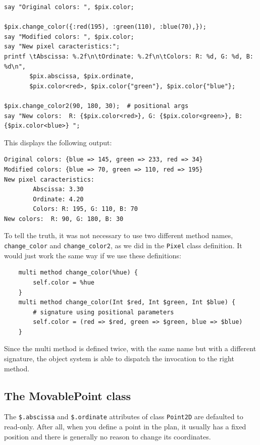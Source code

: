 \begin{verbatim}
say "Original colors: ", $pix.color;

$pix.change_color({:red(195), :green(110), :blue(70),});
say "Modified colors: ", $pix.color;
say "New pixel caracteristics:";
printf \tAbscissa: %.2f\n\tOrdinate: %.2f\n\tColors: R: %d, G: %d, B: %d\n",
       $pix.abscissa, $pix.ordinate, 
       $pix.color<red>, $pix.color{"green"}, $pix.color{"blue"};

$pix.change_color2(90, 180, 30);  # positional args
say "New colors:  R: {$pix.color<red>}, G: {$pix.color<green>}, B: {$pix.color<blue>} ";
\end{verbatim}

This displays the following output:

\begin{verbatim}
Original colors: {blue => 145, green => 233, red => 34}
Modified colors: {blue => 70, green => 110, red => 195}
New pixel caracteristics:
        Abscissa: 3.30
        Ordinate: 4.20
        Colors: R: 195, G: 110, B: 70
New colors:  R: 90, G: 180, B: 30
\end{verbatim}

To tell the truth, it was not necessary to use two different 
method names, \verb'change_color' and \verb'change_color2', as 
we did in the {\tt Pixel} class definition. It would just 
work the same way if we use these definitions:

\begin{verbatim}
    multi method change_color(%hue) {
        self.color = %hue
    }
    multi method change_color(Int $red, Int $green, Int $blue) {
        # signature using positional parameters
        self.color = (red => $red, green => $green, blue => $blue)
    }
\end{verbatim} 

Since the multi method is defined twice, with the same name but 
with a different signature, the object system is able to 
dispatch the invocation to the right method.


\subsection{The MovablePoint class}

The \verb'$.abscissa' and \verb'$.ordinate' attributes of 
class {\tt Point2D} are defaulted to read-only. After all, 
when you define a point in the plan, it usually has a fixed 
position and there is generally no reason to change its 
coordinates.

